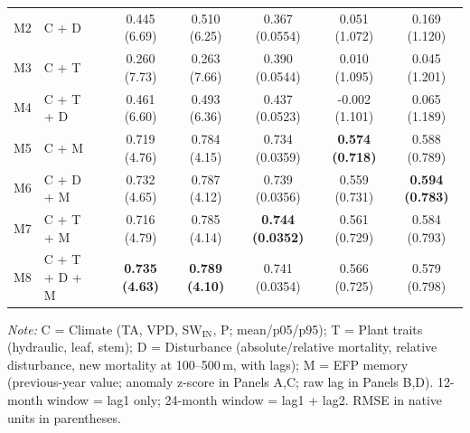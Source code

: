 \begin{table}[htbp]
\begin{tabular}{llcccccc}
M2 & C + D &  & 0.445 (6.69) & 0.510 (6.25) & 0.367 (0.0554) & 0.051 (1.072) & 0.169 (1.120) \\
M3 & C + T &  & 0.260 (7.73) & 0.263 (7.66) & 0.390 (0.0544) & 0.010 (1.095) & 0.045 (1.201) \\
M4 & C + T + D &  & 0.461 (6.60) & 0.493 (6.36) & 0.437 (0.0523) & -0.002 (1.101) & 0.065 (1.189) \\
M5 & C + M &  & 0.719 (4.76) & 0.784 (4.15) & 0.734 (0.0359) & \textbf{0.574 (0.718)} & 0.588 (0.789) \\
M6 & C + D + M &  & 0.732 (4.65) & 0.787 (4.12) & 0.739 (0.0356) & 0.559 (0.731) & \textbf{0.594 (0.783)} \\
M7 & C + T + M &  & 0.716 (4.79) & 0.785 (4.14) & \textbf{0.744 (0.0352)} & 0.561 (0.729) & 0.584 (0.793) \\
M8 & C + T + D + M &  & \textbf{0.735 (4.63)} & \textbf{0.789 (4.10)} & 0.741 (0.0354) & 0.566 (0.725) & 0.579 (0.798) \\
\midrule
\bottomrule
\end{tabular}
\vspace{2pt}
\begin{minipage}{\linewidth}
\footnotesize
\textit{Note:} C = Climate (TA, VPD, SW$_\mathrm{IN}$, P; mean/p05/p95); T = Plant traits (hydraulic, leaf, stem); D = Disturbance (absolute/relative mortality, relative disturbance, new mortality at 100--500\,m, with lags); M = EFP memory (previous-year value; anomaly z-score in Panels A,C; raw lag in Panels B,D). 12-month window = lag1 only; 24-month window = lag1 + lag2. RMSE in native units in parentheses.
\end{minipage}
\end{table}


